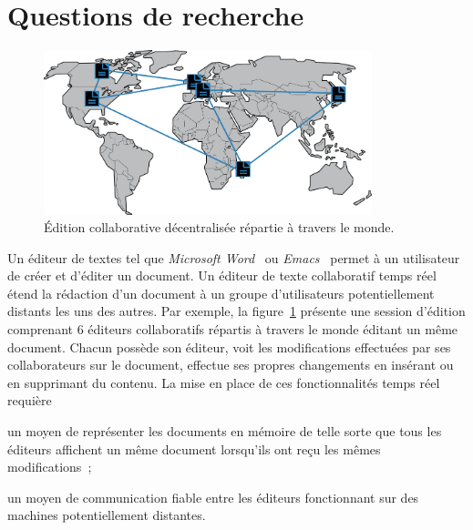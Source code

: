 
\section{Questions de recherche}


\begin{figure}
  \begin{center}
    \includegraphics[width=0.85\textwidth]{img/world.png}
    \caption[Édition collaborative décentralisée]{\label{intro:img:world}Édition
      collaborative décentralisée répartie à travers le monde.}
  \end{center}
\end{figure}

Un éditeur de textes tel que \emph{Microsoft Word}~\cite{word} ou
\emph{Emacs}~\cite{emacs} permet à un utilisateur de créer et d'éditer un
document. Un éditeur de texte collaboratif temps réel~\cite{ellis1991groupware}
étend la rédaction d'un document à un groupe d'utilisateurs potentiellement
distants les uns des autres.  Par exemple, la figure~\ref{intro:img:world}
présente une session d'édition comprenant 6 éditeurs collaboratifs répartis à
travers le monde éditant un même document. Chacun possède son éditeur, voit les
modifications effectuées par ses collaborateurs sur le document, effectue ses
propres changements en insérant ou en supprimant du contenu.  La mise en place
de ces fonctionnalités temps réel requière
\begin{inparaenum}[(i)]
\item un moyen de représenter les documents en mémoire de telle sorte que tous
  les éditeurs affichent un même document lorsqu'ils ont reçu les mêmes
  modifications~\cite{burckhardt2014replicated, shapiro2011conflict};
\item un moyen de communication fiable entre les éditeurs fonctionnant sur des
  machines potentiellement distantes.
\end{inparaenum}

